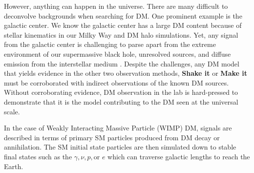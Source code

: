 \begin{figure}[ht]
\end{figure}

However, anything can happen in the universe.
There are many difficult to deconvolve backgrounds when searching for DM.
One prominent example is the galactic center.
We know the galactic center has a large DM content because of stellar kinematics in our Milky Way and DM halo simulations.
Yet, any signal from the galactic center is challenging to parse apart from the extreme environment of our supermassive black hole, unresolved sources, and diffuse emission from the interstellar medium \cite{Tracy:les_houches}.
Despite the challenges, any DM model that yields evidence in the other two observation methods, \textbf{Shake it} or \textbf{Make it} must be corroborated with indirect observations of the known DM sources.
Without corroborating evidence, DM observation in the lab is hard-pressed to demonstrate that it is the model contributing to the DM seen at the universal scale.

In the case of Weakly Interacting Massive Particle (WIMP) DM, signals are described in terms of primary SM particles produced from DM decay or annihilation.
The SM initial state particles are then simulated down to stable final states such as the $\gamma, \nu, p, \text{or } e$ which can traverse galactic lengths to reach the Earth.

